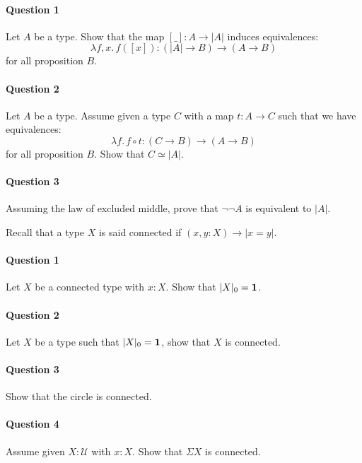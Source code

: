 \documentclass{article}[6pt]%
\newcommand{\U}{{\mathcal U}}
\renewcommand{\r}{\rightarrow}
\newcommand{\Gl}{\lambda}
\newcommand{\one}{{\bf 1}}
\begin{document}
\begin{Exercise}[title={Propositional truncation}]

\paragraph{Question 1} Let $A$ be a type. Show that the map $[\_] : A\r |A|$ induces equivalences:
\[\Gl f,x.\, f([x]) : (|A|\r B) \r (A\r B)\]
for all proposition $B$.%


\paragraph{Question 2} Let $A$ be a type. Assume given a type $C$ with a map $t:A\r C$ such that we have equivalences:
\[\Gl f.\, f\circ t:(C\r B) \r (A\r B)\]
for all proposition $B$. Show that $C\simeq |A|$.

\paragraph{Question 3} Assuming the law of excluded middle, prove that $\lnot\lnot A$ is equivalent to $|A|$.   

\end{Exercise}


\begin{Exercise}[title={Connected types}]
Recall that a type $X$ is said connected if $(x,y:X)\r |x=y|$.

\paragraph{Question 1} Let $X$ be a connected type with $x:X$. Show that $|X|_0=\one$.

\paragraph{Question 2} Let $X$ be a type such that $|X|_0=\one$, show that $X$ is connected.

\paragraph{Question 3} Show that the circle is connected.

\paragraph{Question 4} Assume given $X:\U$ with $x:X$. Show that $\Sigma X$ is connected.

\end{Exercise}
\end{document}
